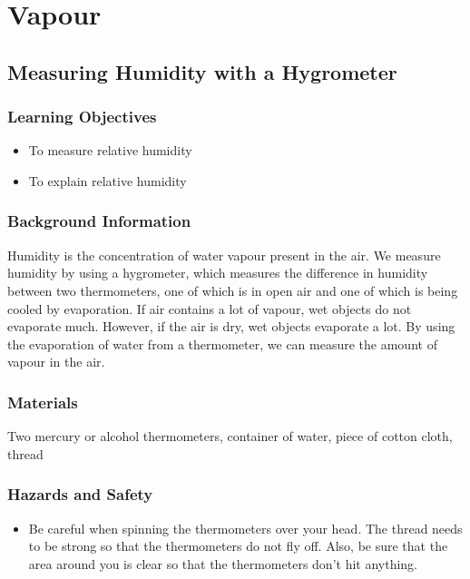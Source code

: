 \section{Vapour}

\subsection{Measuring Humidity with a Hygrometer}

\subsubsection*{Learning Objectives}
\begin{itemize}
\item{To measure relative humidity}
\item{To explain relative humidity}
\end{itemize}

\subsubsection*{Background Information}
Humidity is the concentration of water vapour present in the air.  We measure humidity by using a hygrometer, which measures the difference in humidity between two thermometers, one of which is in open air and one of which is being cooled by evaporation.  If air contains a lot of vapour, wet objects do not evaporate much.  However, if the air is dry, wet objects evaporate a lot.  By using the evaporation of water from a thermometer, we can measure the amount of vapour in the air.

\subsubsection*{Materials}
Two mercury or alcohol thermometers, container of water, piece of cotton cloth, thread

\subsubsection*{Hazards and Safety}
\begin{itemize}
\item{Be careful when spinning the thermometers over your head.  The thread needs to be strong so that the thermometers do not fly off.  Also, be sure that the area around you is clear so that the thermometers don't hit anything.}
\end{itemize}

